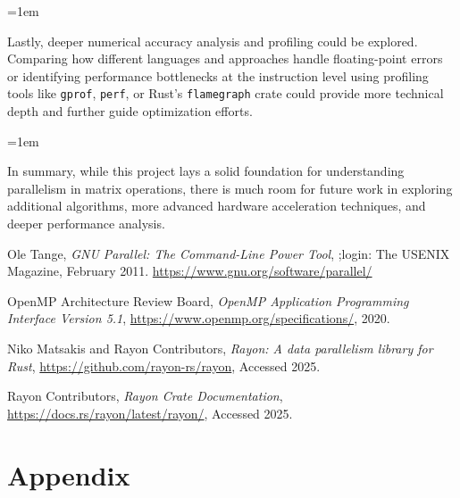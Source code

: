 \documentclass[12pt]{article}
\begin{document}
\parskip=1em

Lastly, deeper numerical accuracy analysis and profiling could be explored. Comparing how different languages and approaches handle
floating-point errors or identifying performance bottlenecks at the instruction level using profiling tools like \texttt{gprof}, \texttt{perf}, or
Rust's \texttt{flamegraph} crate could provide more technical depth and further guide optimization efforts.

\parskip=1em

In summary, while this project lays a solid foundation for understanding parallelism in matrix operations, there is much room for future work in exploring
additional algorithms, more advanced hardware acceleration techniques, and deeper performance analysis.


\newpage
\begin{thebibliography}{9}

    Ole Tange, \textit{GNU Parallel: The Command-Line Power Tool}, ;login: The USENIX Magazine, February 2011. \url{https://www.gnu.org/software/parallel/}

    OpenMP Architecture Review Board, \textit{OpenMP Application Programming Interface Version 5.1},
    \url{https://www.openmp.org/specifications/}, 2020.

    Niko Matsakis and Rayon Contributors, \textit{Rayon: A data parallelism library for Rust},
    \url{https://github.com/rayon-rs/rayon}, Accessed 2025.

    Rayon Contributors, \textit{Rayon Crate Documentation}, \url{https://docs.rs/rayon/latest/rayon/}, Accessed 2025.

\end{thebibliography}

\pagebreak

\section*{Appendix}
\end{document}
